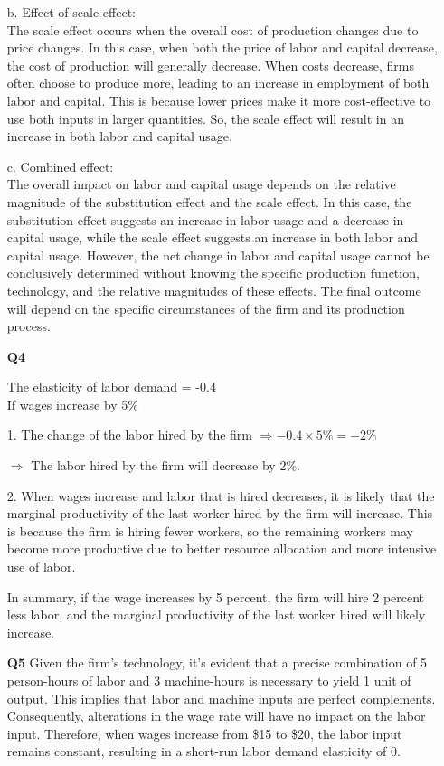 \documentclass[12pt]{article}
\begin{document}
\begin{enumerate}
    b.  Effect of scale effect:\\
    The scale effect occurs when the overall cost of production changes due to price changes. In this case, when both the price of labor and capital decrease, the cost of production will generally decrease. When costs decrease, firms often choose to produce more, leading to an increase in employment of both labor and capital. This is because lower prices make it more cost-effective to use both inputs in larger quantities. So, the scale effect will result in an increase in both labor and capital usage.
    
    c.  Combined effect:\\
    The overall impact on labor and capital usage depends on the relative magnitude of the substitution effect and the scale effect. In this case, the substitution effect suggests an increase in labor usage and a decrease in capital usage, while the scale effect suggests an increase in both labor and capital usage. However, the net change in labor and capital usage cannot be conclusively determined without knowing the specific production function, technology, and the relative magnitudes of these effects. The final outcome will depend on the specific circumstances of the firm and its production process.\newpage
    
    \item[\textbf{Q4}] 

    The elasticity of labor demand = -0.4\\
    If wages increase by 5\%
    
    1. The change of the labor hired by the firm $\Rightarrow -0.4 \times 5\% = -2\%$
    
    
    $\Rightarrow$ The labor hired by the firm will decrease by $2\%$.

    2. When wages increase and labor that is hired decreases, it is likely that the marginal productivity of the last worker hired by the firm will increase. This is because the firm is hiring fewer workers, so the remaining workers may become more productive due to better resource allocation and more intensive use of labor.

    In summary, if the wage increases by 5 percent, the firm will hire 2 percent less labor, and the marginal productivity of the last worker hired will likely increase.

    \item[\textbf{Q5}] 
    Given the firm's technology, it's evident that a precise combination of 5 person-hours of labor and 3 machine-hours is necessary to yield 1 unit of output. This implies that labor and machine inputs are perfect complements. Consequently, alterations in the wage rate will have no impact on the labor input. Therefore, when wages increase from \$15 to \$20, the labor input remains constant, resulting in a short-run labor demand elasticity of 0.
    

\end{enumerate}
\end{document}
